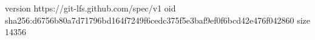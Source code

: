 version https://git-lfs.github.com/spec/v1
oid sha256:d6756b80a7d71796bd164f7249f6cedc375f5e3baf9ef0f6bcd42e476f042860
size 14356
